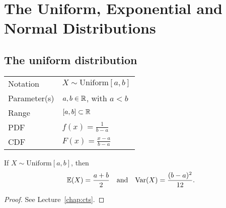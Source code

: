 \chapter{The Uniform, Exponential and Normal Distributions}\label{chap:uniform_exponential_normal}

\section{The uniform distribution}
\begin{center}
\begin{tabular}{ll}\hline
Notation			& $X\sim\text{Uniform}[a,b]$ \\
Parameter(s)		& $a,b\in\mathbb{R}$, with $a<b$ \\
Range			& $[a,b]\subset\mathbb{R}$ \\
PDF				& $f(x) = \displaystyle\frac{1}{b-a}$ \\[2ex]
CDF				& $F(x) = \displaystyle\frac{x-a}{b-a}$ \\[2ex] \hline
\end{tabular}
\end{center}

\begin{lemma}
If $X\sim\text{Uniform}[a,b]$, then 
\[
\mathbb{E}(X)= \frac{a+b}{2} \quad\text{and}\quad \text{Var}(X) = \frac{(b-a)^2}{12}.
\]
\end{lemma}

\begin{proof}
\hideoff
See Lecture~\ref{chap:cts}.
\hideon
\end{proof}

